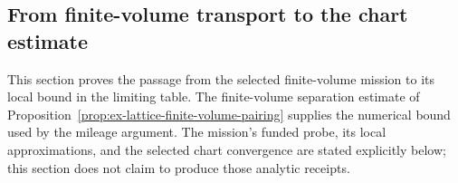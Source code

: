 \subsection{From finite-volume transport to the chart estimate}
\label{sec:ex-lattice-trace-mission-price}

This section proves the passage from the selected finite-volume mission to
its local bound in the limiting table. The finite-volume separation estimate
of Proposition~\ref{prop:ex-lattice-finite-volume-pairing} supplies the
numerical bound used by the mileage argument. The mission's funded probe,
its local approximations, and the selected chart convergence are stated
explicitly below; this section does not claim to produce those analytic
receipts.

